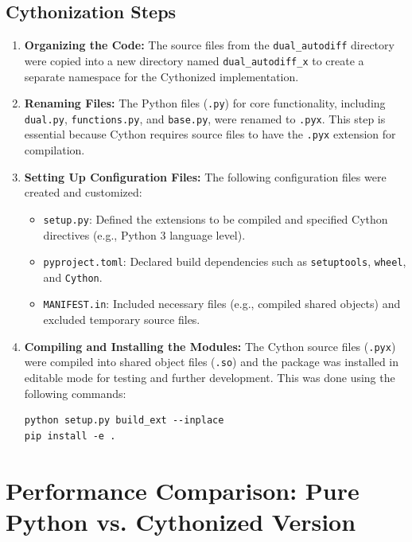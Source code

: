 \documentclass[a4paper,12pt]{article}
\begin{document}
\subsection{Cythonization Steps}
\begin{enumerate}
    \item \textbf{Organizing the Code:}
    The source files from the \texttt{dual\_autodiff} directory were copied into a new directory named \texttt{dual\_autodiff\_x} to create a separate namespace for the Cythonized implementation.

    \item \textbf{Renaming Files:}
    The Python files (\texttt{.py}) for core functionality, including \texttt{dual.py}, \texttt{functions.py}, and \texttt{base.py}, were renamed to \texttt{.pyx}. This step is essential because Cython requires source files to have the \texttt{.pyx} extension for compilation.

    \item \textbf{Setting Up Configuration Files:}
    The following configuration files were created and customized:
    \begin{itemize}
        \item \texttt{setup.py}: Defined the extensions to be compiled and specified Cython directives (e.g., Python 3 language level).
        \item \texttt{pyproject.toml}: Declared build dependencies such as \texttt{setuptools}, \texttt{wheel}, and \texttt{Cython}.
        \item \texttt{MANIFEST.in}: Included necessary files (e.g., compiled shared objects) and excluded temporary source files.
    \end{itemize}

    \item \textbf{Compiling and Installing the Modules:}
The Cython source files (\texttt{.pyx}) were compiled into shared object files (\texttt{.so}) and the package was installed in editable mode for testing and further development. This was done using the following commands:
\begin{verbatim}
python setup.py build_ext --inplace
pip install -e .
\end{verbatim}
\end{enumerate}

\section{Performance Comparison: Pure Python vs. Cythonized Version}
\end{document}
